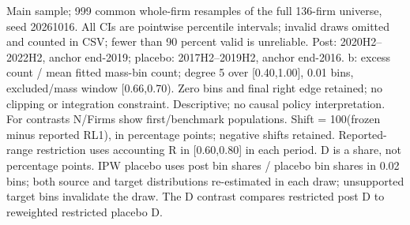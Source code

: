 \begin{threeparttable}
\begin{tablenotes}[flushleft]
\item[] Main sample; 999 common whole-firm resamples of the full 136-firm universe, seed 20261016. All CIs are pointwise percentile intervals; invalid draws omitted and counted in CSV; fewer than 90 percent valid is unreliable. Post: 2020H2--2022H2, anchor end-2019; placebo: 2017H2--2019H2, anchor end-2016. b: excess count / mean fitted mass-bin count; degree 5 over [0.40,1.00], 0.01 bins, excluded/mass window [0.66,0.70). Zero bins and final right edge retained; no clipping or integration constraint. Descriptive; no causal policy interpretation. For contrasts N/Firms show first/benchmark populations. Shift = 100(frozen minus reported RL1), in percentage points; negative shifts retained. Reported-range restriction uses accounting R in [0.60,0.80] in each period. D is a share, not percentage points. IPW placebo uses post bin shares / placebo bin shares in 0.02 bins; both source and target distributions re-estimated in each draw; unsupported target bins invalidate the draw. The D contrast compares restricted post D to reweighted restricted placebo D.
\end{tablenotes}
\end{threeparttable}
\endgroup
\par\medskip
